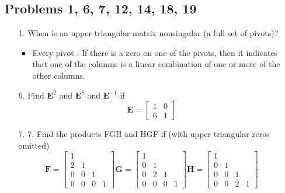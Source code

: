 \begin{itemize}
  \item []

    \subsection{Problems 1, 6, 7, 12, 14, 18, 19}
    \begin{itemize}\color{foreground-2}
      \item[1.] When is an upper triangular matrix nonsingular (a full set of
        pivots)?

      \begin{itemize}\color{foreground}
         \item Every pivot . If there is a zero on one of
           the pivots, then it indicates that one of the columns is a linear
           combination of one or more of the other columns.
      \end{itemize}

      \item[6.] Find \( \bm{E}^2 \) and \( \bm{E}^8 \) and \( \bm{E}^{-1} \) if
      \[%
      \bm{E} = \begin{bmatrix}
        1 & 0 \\
        6 & 1
      \end{bmatrix}
      \]%

      \item[7.] 7. Find the products FGH and HGF if (with upper triangular
        zeros omitted)
        \[%
        \bm{F} = \begin{bmatrix}
          1 &  &  \\
          2 & 1 &  \\
          0 & 0 & 1 \\
          0 & 0 & 0 & 1
        \end{bmatrix}
        \bm{G} = \begin{bmatrix}
          1 &  &  \\
          0 & 1 &  \\
          0 & 2 & 1 \\
          0 & 0 & 0 & 1
        \end{bmatrix}
        \bm{H} = \begin{bmatrix}
          1 &  &  \\
          0 & 1 &  \\
          0 & 0 & 1 \\
          0 & 0 & 2 & 1
        \end{bmatrix}
        \]%


\end{itemize}
\end{itemize}
